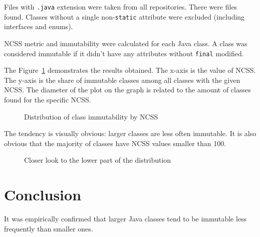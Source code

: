 \documentclass[12pt]{article}
\begin{document}
Files with \texttt{.java} extension were taken from all repositories.
There were \totaljavafiles{} files found. Classes without a single
non-\texttt{static} attribute were excluded (including interfaces and enums).

NCSS metric and immutability were calculated for each Java class.
A class was considered immutable if it didn't have any
attributes without \texttt{final} modified.

The Figure~\ref{fig:1} demonstrates the results obtained. The x-axis is
the value of NCSS. The y-axis is the share of immutable classes among
all classes with the given NCSS. The diameter of the plot on the graph
is related to the amount of classes found for the specific NCSS.

\begin{figure}[h]
  
  \caption{Distribution of class immutability by NCSS}
  \label{fig:1}
\end{figure}

The tendency is visually obvious: larger classes are less often immutable. It
is also obvious that the majority of classes have NCSS values smaller than 100.

\begin{figure}[h]
  
  \caption{Closer look to the lower part of the distribution}
  \label{fig:2}
\end{figure}

\section{Conclusion}

It was empirically confirmed that larger Java classes tend to be immutable
less frequently than smaller ones.
\end{document}

